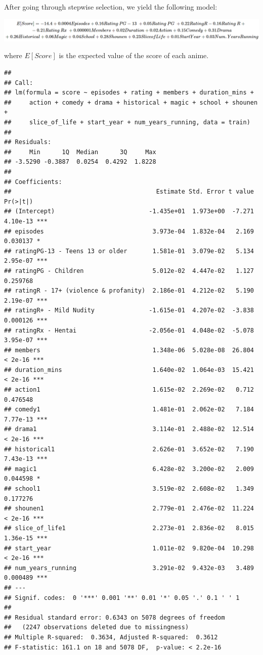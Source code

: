\documentclass[
]{article}
\begin{document}
After going through stepwise selection, we yield the following model:

\begin{center}\includegraphics[width=20.81in]{img/mod_equ} \end{center}

where \(E[Score]\) is the expected value of the score of each anime.

\begin{verbatim}
## 
## Call:
## lm(formula = score ~ episodes + rating + members + duration_mins + 
##     action + comedy + drama + historical + magic + school + shounen + 
##     slice_of_life + start_year + num_years_running, data = train)
## 
## Residuals:
##     Min      1Q  Median      3Q     Max 
## -3.5290 -0.3887  0.0254  0.4292  1.8228 
## 
## Coefficients:
##                                        Estimate Std. Error t value Pr(>|t|)    
## (Intercept)                          -1.435e+01  1.973e+00  -7.271 4.10e-13 ***
## episodes                              3.973e-04  1.832e-04   2.169 0.030137 *  
## ratingPG-13 - Teens 13 or older       1.581e-01  3.079e-02   5.134 2.95e-07 ***
## ratingPG - Children                   5.012e-02  4.447e-02   1.127 0.259768    
## ratingR - 17+ (violence & profanity)  2.186e-01  4.212e-02   5.190 2.19e-07 ***
## ratingR+ - Mild Nudity               -1.615e-01  4.207e-02  -3.838 0.000126 ***
## ratingRx - Hentai                    -2.056e-01  4.048e-02  -5.078 3.95e-07 ***
## members                               1.348e-06  5.028e-08  26.804  < 2e-16 ***
## duration_mins                         1.640e-02  1.064e-03  15.421  < 2e-16 ***
## action1                               1.615e-02  2.269e-02   0.712 0.476548    
## comedy1                               1.481e-01  2.062e-02   7.184 7.77e-13 ***
## drama1                                3.114e-01  2.488e-02  12.514  < 2e-16 ***
## historical1                           2.626e-01  3.652e-02   7.190 7.43e-13 ***
## magic1                                6.428e-02  3.200e-02   2.009 0.044598 *  
## school1                               3.519e-02  2.608e-02   1.349 0.177276    
## shounen1                              2.779e-01  2.476e-02  11.224  < 2e-16 ***
## slice_of_life1                        2.273e-01  2.836e-02   8.015 1.36e-15 ***
## start_year                            1.011e-02  9.820e-04  10.298  < 2e-16 ***
## num_years_running                     3.291e-02  9.432e-03   3.489 0.000489 ***
## ---
## Signif. codes:  0 '***' 0.001 '**' 0.01 '*' 0.05 '.' 0.1 ' ' 1
## 
## Residual standard error: 0.6343 on 5078 degrees of freedom
##   (2247 observations deleted due to missingness)
## Multiple R-squared:  0.3634, Adjusted R-squared:  0.3612 
## F-statistic: 161.1 on 18 and 5078 DF,  p-value: < 2.2e-16
\end{verbatim}
\end{document}
